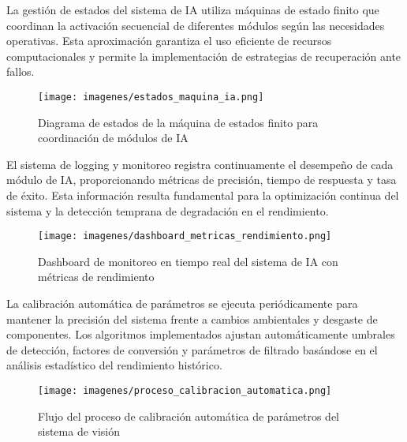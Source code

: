 La gestión de estados del sistema de IA utiliza máquinas de estado finito que coordinan la activación secuencial de diferentes módulos según las necesidades operativas. Esta aproximación garantiza el uso eficiente de recursos computacionales y permite la implementación de estrategias de recuperación ante fallos.

\begin{figure}[h]
\centering
\texttt{[image: imagenes/estados\_maquina\_ia.png]}
\caption{Diagrama de estados de la máquina de estados finito para coordinación de módulos de IA}
\label{fig:estados_maquina_ia}
\end{figure}

El sistema de logging y monitoreo registra continuamente el desempeño de cada módulo de IA, proporcionando métricas de precisión, tiempo de respuesta y tasa de éxito. Esta información resulta fundamental para la optimización continua del sistema y la detección temprana de degradación en el rendimiento.

\begin{figure}[h]
\centering
\texttt{[image: imagenes/dashboard\_metricas\_rendimiento.png]}
\caption{Dashboard de monitoreo en tiempo real del sistema de IA con métricas de rendimiento}
\label{fig:dashboard_metricas}
\end{figure}

La calibración automática de parámetros se ejecuta periódicamente para mantener la precisión del sistema frente a cambios ambientales y desgaste de componentes. Los algoritmos implementados ajustan automáticamente umbrales de detección, factores de conversión y parámetros de filtrado basándose en el análisis estadístico del rendimiento histórico.

\begin{figure}[h]
\centering
\texttt{[image: imagenes/proceso\_calibracion\_automatica.png]}
\caption{Flujo del proceso de calibración automática de parámetros del sistema de visión}
\label{fig:proceso_calibracion}
\end{figure}